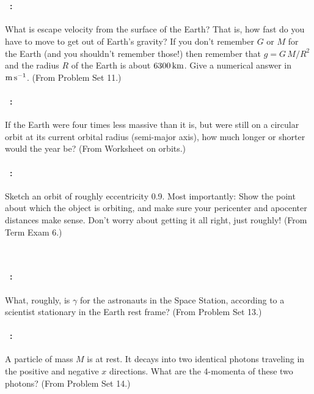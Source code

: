 \documentclass[12pt]{article} 
\begin{document}
\vfill
~
\clearpage

\paragraph{\problemname~\theproblem:}%
What is escape velocity from the surface of the Earth? That is, how
fast do you have to move to get out of Earth's gravity?
If you don't remember $G$ or $M$ for the Earth (and you shouldn't remember
those!) then remember that $g = G\,M/R^2$ and the radius $R$ of the Earth is
about $6300\,\mathrm{km}$.
Give a numerical answer in $\mathrm{m}\,\mathrm{s}^{-1}$.
(From Problem Set 11.)

\vfill

\paragraph{\problemname~\theproblem:}%
If the Earth were four times less massive than it is, but were still
on a circular orbit at its current orbital radius (semi-major axis),
how much longer or shorter would the year be?  (From Worksheet on
orbits.)

\vfill

\paragraph{\problemname~\theproblem:}%
Sketch an orbit of roughly eccentricity 0.9. Most importantly: Show the
point about which the object is orbiting, and make sure your pericenter
and apocenter distances make sense. Don't worry about getting it all right,
just roughly!
(From Term Exam 6.)

\vfill
~
\clearpage

\paragraph{\problemname~\theproblem:}%
What, roughly, is $\gamma$ for the astronauts in the Space Station,
according to a scientist stationary in the Earth rest frame?
(From Problem Set 13.)

\vfill

\paragraph{\problemname~\theproblem:}%
A particle of mass $M$ is at rest. It decays into two identical
photons traveling in the positive and negative $x$ directions.
What are the 4-momenta of these two photons?
(From Problem Set 14.)
\end{document}
